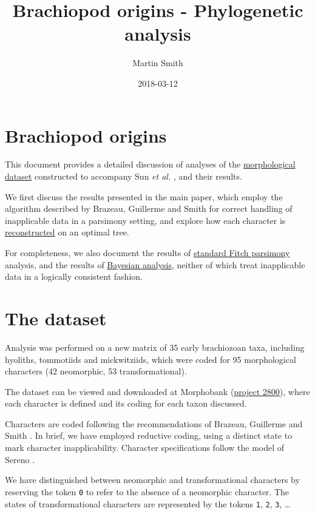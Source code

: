 \documentclass[]{book}
\title{Brachiopod origins - Phylogenetic analysis}
\author{Martin Smith}
\date{2018-03-12}
\theoremstyle{definition}
\theoremstyle{definition}
\theoremstyle{definition}
\theoremstyle{remark}
\begin{document}
\maketitle

{
\setcounter{tocdepth}{1}
\tableofcontents
}
\hypertarget{brachiopod-origins}{%
\chapter*{Brachiopod origins}\label{brachiopod-origins}}

This document provides a detailed discussion of analyses of the
\protect\hyperlink{dataset}{morphological dataset} constructed to
accompany Sun \emph{et al.} \citeyearpar{Sun2018}, and their results.

We first discuss the results presented in the main paper, which employ
the algorithm described by Brazeau, Guillerme and Smith
\citeyearpar{Brazeau2018} for correct handling of inapplicable data in a
parsimony setting, and explore how each character is
\protect\hyperlink{reconstructions}{reconstructed} on an optimal tree.

For completeness, we also document the results of
\protect\hyperlink{tnt}{standard Fitch parsimony} analysis, and the
results of \protect\hyperlink{MrBayes}{Bayesian analysis}, neither of
which treat inapplicable data in a logically consistent fashion.

\hypertarget{the-dataset}{%
\chapter{The dataset}\label{the-dataset}}

Analysis was performed on a new matrix of 35 early brachiozoan taxa,
including hyoliths, tommotiids and mickwitziids, which were coded for 95
morphological characters (42 neomorphic, 53 transformational).

The dataset can be viewed and downloaded at Morphobank
(\href{https://morphobank.org/permalink/?P2800}{project 2800}), where
each character is defined and its coding for each taxon discussed.

Characters are coded following the recommendations of Brazeau, Guillerme
and Smith \citep{Brazeau2018}. In brief, we have employed reductive
coding, using a distinct state to mark character inapplicability.
Character specifications follow the model of Sereno
\citeyearpar{Sereno2007}.

We have distinguished between neomorphic and transformational characters
\citep[sensu][]{Sereno2007} by reserving the token \texttt{0} to refer
to the absence of a neomorphic character. The states of transformational
characters are represented by the tokens \texttt{1}, \texttt{2},
\texttt{3}, \ldots{}
\end{document}
